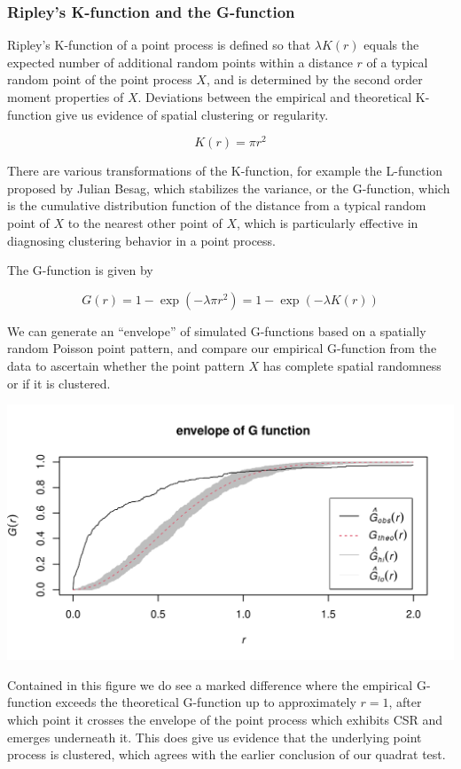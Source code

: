 \documentclass[
  12pt,
]{article}
\begin{document}
\hypertarget{ripleys-k-function-and-the-g-function}{%
\subsubsection{Ripley's K-function and the
G-function}\label{ripleys-k-function-and-the-g-function}}

Ripley's K-function of a point process is defined so that
\(\lambda K(r)\) equals the expected number of additional random points
within a distance \(r\) of a typical random point of the point process
\(X\), and is determined by the second order moment properties of \(X\).
Deviations between the empirical and theoretical K-function give us
evidence of spatial clustering or regularity.

\[K(r) = \pi r ^2\]

There are various transformations of the K-function, for example the
L-function proposed by Julian Besag, which stabilizes the variance, or
the G-function, which is the cumulative distribution function of the
distance from a typical random point of \(X\) to the nearest other point
of \(X\), which is particularly effective in diagnosing clustering
behavior in a point process.

The G-function is given by

\[G(r) = 1 - \exp(-\lambda  \pi r^2) = 1 - \exp(-\lambda K(r))\]

We can generate an ``envelope'' of simulated G-functions based on a
spatially random Poisson point pattern, and compare our empirical
G-function from the data to ascertain whether the point pattern \(X\)
has complete spatial randomness or if it is clustered.

\includegraphics{JStevenRaquel_STATS295_Final_files/figure-latex/plot-G-function-1.pdf}

Contained in this figure we do see a marked difference where the
empirical G-function exceeds the theoretical G-function up to
approximately \(r = 1\), after which point it crosses the envelope of
the point process which exhibits CSR and emerges underneath it. This
does give us evidence that the underlying point process is clustered,
which agrees with the earlier conclusion of our quadrat test.
\end{document}
